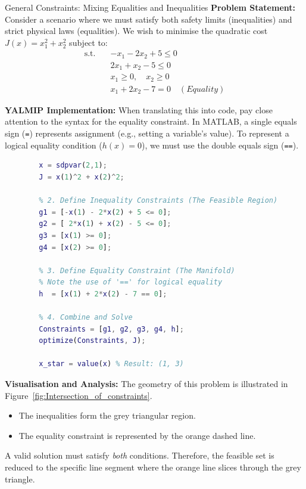 \begin{examplebox}{General Constraints: Mixing Equalities and Inequalities}
	\textbf{Problem Statement:}
	Consider a scenario where we must satisfy both safety limits (inequalities) and strict physical laws (equalities). We wish to minimise the quadratic cost $J(x) = x_1^2 + x_2^2$ subject to:
	\begin{equation*}
		\begin{aligned}
			\text{s.t.} \quad & -x_1 - 2x_2 + 5 \leq 0 \\
			& 2x_1 + x_2 - 5 \leq 0 \\
			& x_1 \ge 0, \quad x_2 \ge 0 \\
			& x_1 + 2x_2 - 7 = 0 \quad {(Equality)}
		\end{aligned}
	\end{equation*}
	
	\solution
	
	\textbf{YALMIP Implementation:}
	When translating this into code, pay close attention to the syntax for the equality constraint. In MATLAB, a single equals sign (\texttt{=}) represents assignment (e.g., setting a variable's value). To represent a logical equality condition ($h(x)=0$), we must use the double equals sign (\texttt{==}).
	
	\begin{lstlisting}[language=Matlab]
		% 1. Define Variables and Objective
		x = sdpvar(2,1);
		J = x(1)^2 + x(2)^2;
		
		% 2. Define Inequality Constraints (The Feasible Region)
		g1 = [-x(1) - 2*x(2) + 5 <= 0]; 
		g2 = [ 2*x(1) + x(2) - 5 <= 0]; 
		g3 = [x(1) >= 0];               
		g4 = [x(2) >= 0];     
		
		% 3. Define Equality Constraint (The Manifold)
		% Note the use of '==' for logical equality
		h  = [x(1) + 2*x(2) - 7 == 0];
		
		% 4. Combine and Solve
		Constraints = [g1, g2, g3, g4, h];
		optimize(Constraints, J);
		
		x_star = value(x) % Result: (1, 3)
	\end{lstlisting}
	
	\textbf{Visualisation and Analysis:}
	The geometry of this problem is illustrated in Figure~\ref{fig:Intersection_of_constraints}.
	\begin{itemize}
		\item The inequalities form the grey triangular region.
		\item The equality constraint is represented by the orange dashed line.
	\end{itemize}
	A valid solution must satisfy \textit{both} conditions. Therefore, the feasible set is reduced to the specific line segment where the orange line slices through the grey triangle.
	

\end{examplebox}
